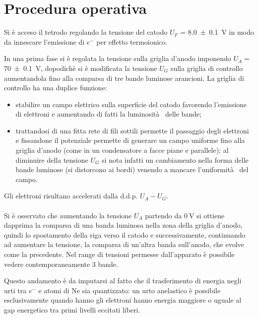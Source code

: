 \section{Procedura operativa}

	Si è acceso il tetrodo regolando la tensione del catodo $U_F$ = \SI{8.0 \pm 0.1}{\volt}
	in modo da innescare l'emissione di $e^{-}$ per effetto termoionico.
	
	In una prima fase si è regolata la tensione sulla griglia d'anodo imponendo $U_A=$ \SI{70 \pm 0.1}{\volt},	dopodichè si è modificata la tensione $U_G$ sulla griglia di controllo aumentandola fino alla comparsa di tre bande luminose arancioni.
	La griglia di controllo ha una duplice funzione: 
	\begin{itemize}
	\item  stabilire un campo elettrico sulla superficie del catodo favorendo l'emissione di elettroni e aumentando di fatti la luminosità  delle bande;
	\item trattandosi di una fitta rete di fili sottili permette il passaggio degli elettroni e fissandone il potenziale permette di generare un campo uniforme fino alla griglia d'anodo (come in un condensatore a facce piane e parallele); al diminuire della tensione $U_G$ si nota infatti un cambiamento nella forma delle bande luminose (si distorcono ai bordi) venendo a mancare l'uniformità  del campo.
	\end{itemize}
	
	Gli elettroni risultano accelerati dalla d.d.p. $U_A-U_G$.

\paragraph{}	
	Si è osservato che aumentando la tensione $U_A$ partendo da $\SI{0}{\volt}$ si ottiene
	dapprima la comparsa di una banda luminosa nella zona della griglia d'anodo, quindi lo spostamento della riga verso il catodo e successivamente, continuando ad aumentare  la tensione, la comparsa di un'altra banda sull'anodo, che evolve come la precedente.
	 Nel range di tensioni permesse dall'apparato è possibile vedere contemporaneamente 3 bande.
	 
		Questo andamento è da imputarsi al fatto che il trasferimento 
		di energia negli urti tra $e^{-}$ e atomi di Ne sia 
		quantizzato: un urto anelastico è possibile esclusivamente quando hanno gli elettroni hanno energia maggiore o uguale
		al gap energetico tra primi livelli eccitati liberi.
		
